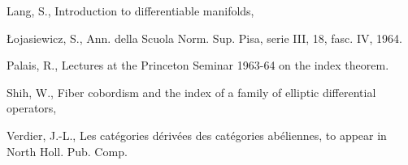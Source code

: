 \begin{enumerate}[label={[\arabic*]}]
%
\item
Lang, S., Introduction to differentiable manifolds,
\item \L{}ojasiewicz, S., Ann. della Scuola Norm. Sup. Pisa, serie III, 18, fasc. IV, 1964.
\item Palais, R., Lectures at the Princeton Seminar 1963-64 on the index theorem.
\item Shih, W., Fiber cobordism and the index of a family of elliptic differential operators,
\item Verdier, J.-L., Les catégories dérivées des catégories abéliennes, to appear in North Holl. Pub. Comp.
\end{enumerate}

\providecommand{\Ob}{\operatorname{Ob}}
\providecommand{\qcoh}{\mathrm{qcoh}}
\providecommand{\coh}{\mathrm{coh}}
\providecommand{\torf}{\mathrm{torf}}
\providecommand{\toramp}{\operatorname{tor.amp}}
\providecommand{\amp}{\operatorname{amp}}
\providecommand{\Id}{\operatorname{Id}}
\providecommand{\pr}{\operatorname{pr}}
\providecommand{\coker}{\operatorname{coker}}
\providecommand{\im}{\operatorname{Im}}
\providecommand{\Spec}{\operatorname{Spec}}

\renewcommand{\Ob}{\operatorname{ob}}
\providecommand{\qcoh}{\mathrm{qcoh}}
\providecommand{\coh}{\mathrm{coh}}
\providecommand{\torf}{\mathrm{torf}}
\providecommand{\toramp}{\operatorname{tor.amp}}
\providecommand{\amp}{\operatorname{amp}}
\providecommand{\Id}{\operatorname{Id}}
\providecommand{\pr}{\operatorname{pr}}
\providecommand{\coker}{\operatorname{coker}}
\providecommand{\im}{\operatorname{Im}}
\providecommand{\Spec}{\operatorname{Spec}}

